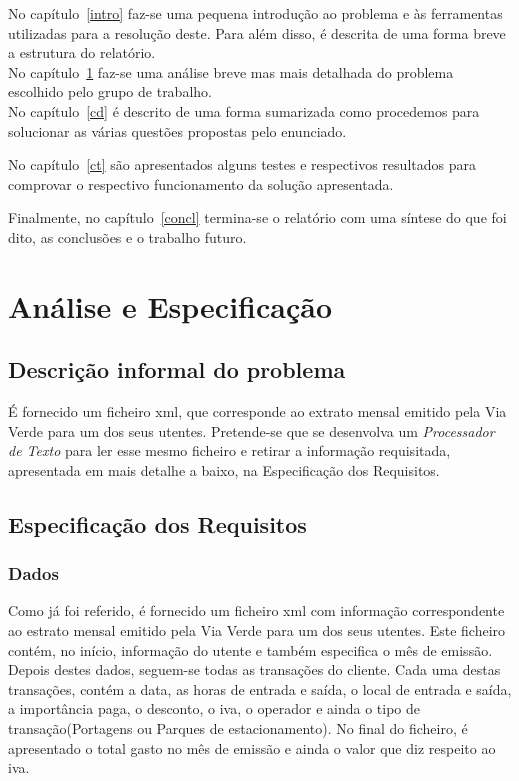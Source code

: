 \documentclass{report}
\def\pt{\emph{Processador de Texto}\xspace}
\begin{document}
No capítulo~\ref{intro} faz-se uma pequena introdução ao problema e às ferramentas utilizadas para a resolução deste.
Para além disso, é descrita de uma forma breve a estrutura do relatório.\\
No capítulo~\ref{ae} faz-se uma análise breve mas mais detalhada do problema escolhido pelo grupo de trabalho.\\
No capítulo~\ref{cd} é descrito de uma forma sumarizada como procedemos para solucionar as várias questões propostas pelo enunciado.

No capítulo~\ref{ct} são apresentados alguns testes e respectivos resultados para comprovar o respectivo funcionamento da solução apresentada.

Finalmente, no capítulo~\ref{concl} termina-se o relatório com uma síntese do que foi dito, as conclusões e o trabalho futuro.

\chapter{Análise e Especificação} \label{ae}
\section{Descrição informal do problema}
É fornecido um ficheiro xml, que corresponde ao extrato mensal emitido pela Via Verde para um dos seus utentes. 
Pretende-se que se desenvolva um \pt para ler esse mesmo ficheiro e retirar a informação requisitada, apresentada 
em mais detalhe a baixo, na Especificação dos Requisitos.
\section{Especificação dos Requisitos}
\subsection{Dados}
Como já foi referido, é fornecido um ficheiro xml com informação correspondente ao estrato mensal emitido 
pela Via Verde para um dos seus utentes.
Este ficheiro contém, no início, informação do utente e também especifica o mês de emissão. 
Depois destes dados, seguem-se todas as transações do cliente.
Cada uma destas transações, contém a data, as horas de entrada e saída, o
local de entrada e saída, a importância paga, o desconto, o iva, o operador
e ainda o tipo de transação(Portagens ou Parques de estacionamento).
No final do ficheiro, é apresentado o total gasto no mês de emissão e ainda
o valor que diz respeito ao iva.
\end{document}
